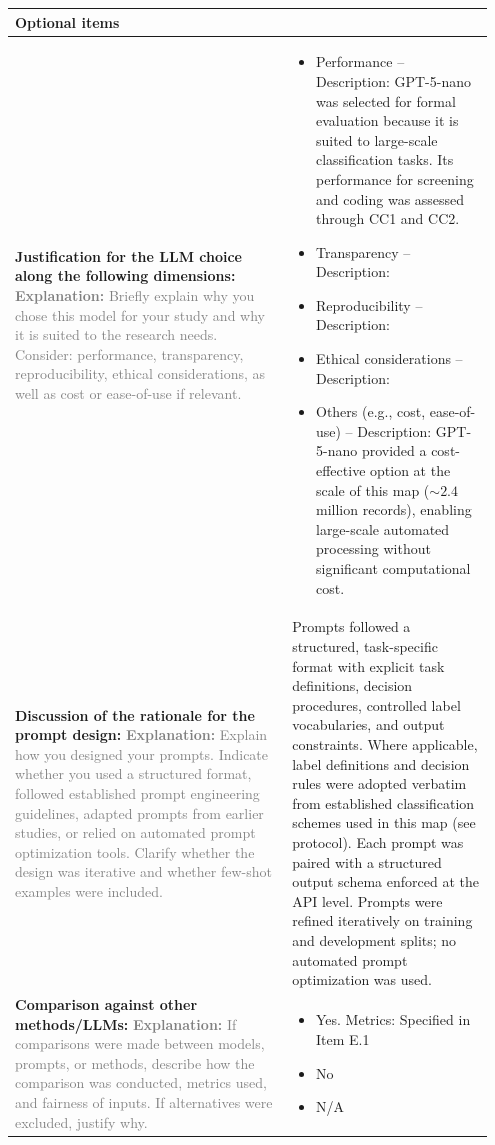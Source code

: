 \documentclass[12pt]{article}
\newcommand{\checked}{\ding{110}}
\newcommand{\unchecked}{\ding{111}}
\begin{document}
\begin{landscape}
{\begin{longtable}{|p{0.55\linewidth}|p{0.40\linewidth}|}
\hline
\multicolumn{2}{|l|}{\cellcolor{yellow!30}\textbf{Optional items}} \\
\hline
\textbf{Justification for the LLM choice along the following dimensions:} \textcolor{gray}{\footnotesize \textbf{Explanation:} Briefly explain why you chose this model for your study and why it is suited to the research needs. Consider: performance, transparency, reproducibility, ethical considerations, as well as cost or ease-of-use if relevant.} & \begin{itemize}[leftmargin=*]\setlength{\itemsep}{0pt}\setlength{\parskip}{0pt} \item[\checked] Performance -- Description: GPT-5-nano was selected for formal evaluation because it is suited to large-scale classification tasks. Its performance for screening and coding was assessed through CC1 and CC2. \item[\unchecked] Transparency -- Description: \item[\unchecked] Reproducibility -- Description: \item[\unchecked] Ethical considerations -- Description: \item[\checked] Others (e.g., cost, ease-of-use) -- Description: GPT-5-nano provided a cost-effective option at the scale of this map (${\sim}2.4$ million records), enabling large-scale automated processing without significant computational cost. \end{itemize} \\
\hline
\textbf{Discussion of the rationale for the prompt design:} \textcolor{gray}{\footnotesize \textbf{Explanation:} Explain how you designed your prompts. Indicate whether you used a structured format, followed established prompt engineering guidelines, adapted prompts from earlier studies, or relied on automated prompt optimization tools. Clarify whether the design was iterative and whether few-shot examples were included.} & Prompts followed a structured, task-specific format with explicit task definitions, decision procedures, controlled label vocabularies, and output constraints. Where applicable, label definitions and decision rules were adopted verbatim from established classification schemes used in this map (see protocol). Each prompt was paired with a structured output schema enforced at the API level. Prompts were refined iteratively on training and development splits; no automated prompt optimization was used. \\
\hline
\textbf{Comparison against other methods/LLMs:} \textcolor{gray}{\footnotesize \textbf{Explanation:} If comparisons were made between models, prompts, or methods, describe how the comparison was conducted, metrics used, and fairness of inputs. If alternatives were excluded, justify why.} & \begin{itemize}[leftmargin=*]\setlength{\itemsep}{0pt} \item[\checked] Yes. Metrics: Specified in Item E.1 \item[\unchecked] No \item[\unchecked] N/A \end{itemize} \\

\end{longtable}}
\end{landscape}
\end{document}
